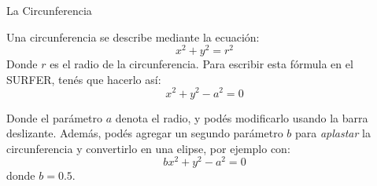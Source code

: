 \documentclass[es]{../../common/SurferDesc}%
\begin{document}
\footnotesize
%


\begin{surferPage}
  \begin{surferTitle}La Circunferencia\end{surferTitle}
   \begin{surferText}
   
Una circunferencia se describe mediante la ecuaci{\'o}n:
\[x^2+y^2=r^2\]
Donde $r$ es el radio de la circunferencia. 
Para escribir esta f{\'o}rmula en el SURFER, tenés que hacerlo as{\'i}:
\[x^2+y^2-a^2=0\]

Donde el par{\'a}metro $a$ denota el radio, y pod{\'e}s modificarlo usando la barra deslizante. Además, pod{\'e}s agregar un segundo par{\'a}metro $b$ para {\it aplastar} la circunferencia y convertirlo en una elipse, por ejemplo con:
\[bx^2+y^2-a^2=0\] donde $b=0.5$.


     \end{surferText}
\end{surferPage}
\end{document}
